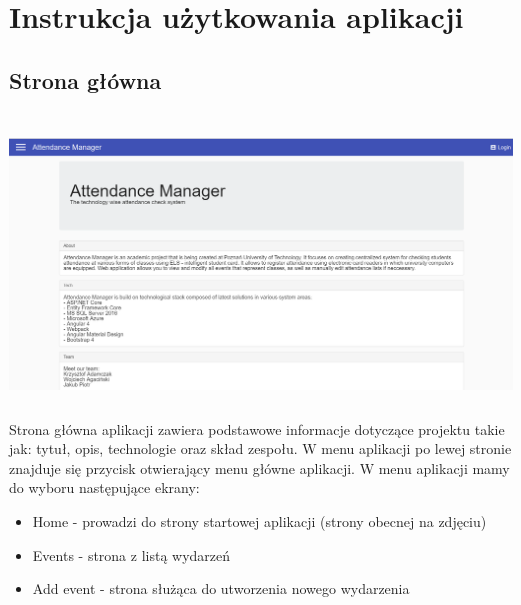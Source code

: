 \newpage\section{Instrukcja użytkowania aplikacji \NazwaSys} \label{sec:instrukcja}

\subsection{Strona główna}
\includegraphics[height=8cm,width=15cm]{images/MainScreen}
Strona główna aplikacji zawiera podstawowe informacje dotyczące projektu takie jak: tytuł, opis, technologie oraz skład zespołu. W menu aplikacji po lewej stronie znajduje się przycisk otwierający menu główne aplikacji. W menu aplikacji mamy do wyboru następujące ekrany:
\begin{itemize}
    \item Home - prowadzi do strony startowej aplikacji (strony obecnej na zdjęciu)
    \item Events - strona z listą wydarzeń
    \item Add event - strona służąca do utworzenia nowego wydarzenia
\end{itemize}

